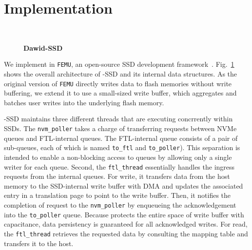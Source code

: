 \section{Implementation}
\begin{figure}[t!]
    \centering{}
	 \\

    \caption{\textbf{Dawid-SSD}}
    \label{fig_dawid_archi}
\end{figure}


We implement \ours{} in \texttt{FEMU}, an open-source SSD development
framework~\cite{li2018case}. Fig.~\ref{fig_dawid_archi} shows the overall
architecture of \ours{}-SSD and its internal data structures. As the original
version of \texttt{FEMU} directly writes data to flash memories without write
buffering, we extend it to use a small-sized write buffer, which aggregates and  
batches user writes into the underlying flash memory.  

\ours{}-SSD maintains three different threads that are executing concrrently
within SSDs.  The \texttt{nvm\_poller} takes a charge of transferring requests
between NVMe queues and FTL-internal queues. The FTL-internal queue consists of
a pair of sub-queues, each of which is named \texttt{to\_ftl} and
\texttt{to\_poller}). This separation is intended to enable a non-blocking
access to queues by allowing only a single writer for each queue.  Second, the
\texttt{ftl\_thread} essentially handles the ingress requests from the internal
queues. For write, it transfers data from the host memory to the SSD-internal
write buffer with DMA and updates the associated entry in a translation page to
point to the write buffer. Then, it notifies the completion of request to the
\texttt{nvm\_poller} by enqueueing the acknowledgement into the
\texttt{to\_poller} queue.  Because \ours{} protects the entire space of write
buffer with capacitance, data persistency is guaranteed for all acknowledged
writes.  For read, the \texttt{ftl\_thread} retrieves the requested data by
consulting the mapping table and transfers it to the host. 

